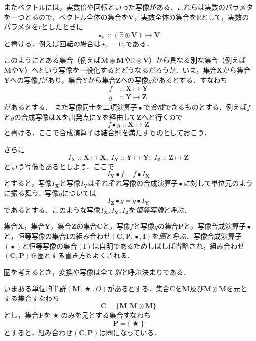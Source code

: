 \documentclass[twocolumn]{jsbook}
\newcommand{\keyword}[1]{{\emph{#1}}}
\DeclareMathOperator{\mathAnyBinaryOperator}{\bigstar}
\DeclareMathOperator{\mathAnyUnaryOperator}{\star}
\DeclareMathOperator{\mathCompose}{\bullet}
\DeclareMathOperator{\mathIn}{::}
\DeclareMathOperator{\mathMapsTo}{\mapsto}
\DeclareMathOperator{\mathSetTimes}{\circledast}
\newcommand{\mathSet}[1]{\mathbf{#1}}
\newcommand{\mathSpecialSet}[1]{\mathbb{#1}}
\newcommand{\mathCategoryShort}[2]{(#1,#2)}
\newcommand{\mathMorph}[2]{#1\mathMapsTo#2}
\newcommand{\mathMonoid}[3]{(#1,#2,#3)}
\newcommand{\mathCategory}[4]{(#1,#2,#3,#4)}
\begin{document}
またベクトルには，実数倍や回転といった写像がある．これらは実数のパラメタを一つとるので，ベクトル全体の集合を$\mathSet{V}$，実数全体の集合を$\mathSpecialSet{R}$として，実数のパラメタを$r$としたときに$$\mathAnyUnaryOperator_r\mathIn{}\mathMorph{(\mathSpecialSet{R}\mathSetTimes\mathSet{V})}{\mathSet{V}}$$と書ける．例えば回転の場合は$\mathAnyUnaryOperator_r=U_r$である．

このようにとある集合（例えば$\mathSet{M}\mathSetTimes\mathSet{M}$や$\mathSpecialSet{R}\mathSetTimes\mathSet{V}$）から異なる別な集合（例えば$\mathSet{M}$や$\mathSet{V}$）へという写像を一般化するとどうなるだろうか．いま，集合$\mathSet{X}$から集合$\mathSet{Y}$への写像$f$があり，集合$\mathSet{Y}$から集合$\mathSet{Z}$への写像$g$があるとする．すなわち
\begin{align*}
f&\mathIn\mathMorph{\mathSet{X}}{\mathSet{Y}}\\
g&\mathIn\mathMorph{\mathSet{Y}}{\mathSet{Z}}
\end{align*}
があるとする．
また写像同士を二項演算子$\mathCompose$で\keyword{合成}できるものとする．例えば$f$と$g$の合成写像は$\mathSet{X}$を出発点に$\mathSet{Y}$を経由して$\mathSet{Z}$へと行くので$$f\mathCompose g\mathIn\mathMorph{\mathSet{X}}{\mathSet{Z}}$$と書ける．ここで合成演算子は結合則を満たすものとしておこう．

さらに$$I_\mathSet{X}\mathIn\mathMorph{\mathSet{X}}{\mathSet{X}},\;I_\mathSet{Y}\mathIn\mathMorph{\mathSet{Y}}{\mathSet{Y}},\;I_\mathSet{Z}\mathIn\mathMorph{\mathSet{Z}}{\mathSet{Z}}$$という写像もあるとしよう．ここで$$I_\mathSet{Y}\mathCompose f=f\mathCompose I_\mathSet{X}$$とすると，写像$I_\mathSet{X}$と写像$I_\mathSet{Y}$はそれぞれ写像の合成演算子$\mathCompose$に対して単位元のように振る舞う．写像$g$については$$I_\mathSet{Z}\mathCompose g=g\mathCompose I_\mathSet{Y}$$であるとする．このような写像$I_\mathSet{X},I_\mathSet{Y},I_\mathSet{Z}$を\keyword{恒等写像}と呼ぶ．

集合$\mathSet{X}$，集合$\mathSet{Y}$，集合$\mathSet{Z}$の集合$\mathSet{C}$と，写像$f$と写像$g$の集合$\mathSet{P}$と，写像合成演算子$\mathCompose$と，恒等写像の集合$\mathSet{I}$の組み合わせ$\mathCategory{\mathSet{C}}{\mathSet{P}}{\mathCompose}{\mathSet{I}}$を\keyword{圏}と呼ぶ．写像合成演算子$(\mathCompose)$と恒等写像の集合$(\mathSet{I})$は自明であるためしばしば省略され，組み合わせ$\mathCategoryShort{\mathSet{C}}{\mathSet{P}}$を圏とする書き方もよくされる．

圏を考えるとき，変換や写像は全て\keyword{射}と呼ぶ決まりである．

いまある単位的半群$\mathMonoid{\mathSet{M}}{\mathAnyBinaryOperator}{O}$があるとする．集合$\mathSet{C}$を$\mathSet{M}$及び$\mathSet{M}\mathSetTimes\mathSet{M}$を元とする集合すなわち$$\mathSet{C}=\{\mathSet{M},\mathSet{M}\mathSetTimes\mathSet{M}\}$$とし，集合$\mathSet{P}$を$\mathAnyBinaryOperator$のみを元とする集合すなわち$$\mathSet{P}=\{\mathAnyBinaryOperator\}$$とすると，組み合わせ$\mathCategoryShort{\mathSet{C}}{\mathSet{P}}$は圏になっている．
\end{document}
